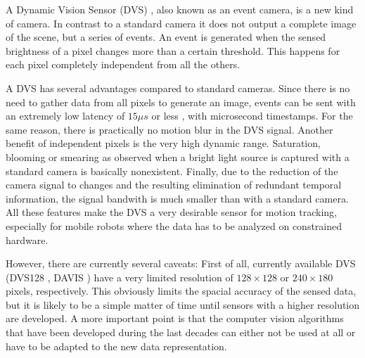 A Dynamic Vision Sensor (DVS) \cite{lpd08dvs}, also known as an event camera,
is a new kind of camera. In contrast to a standard camera it does not output a
complete image of the scene, but a series of events. An event is generated when
the sensed brightness of a pixel changes more than a certain threshold. This
happens for each pixel completely independent from all the others.

A DVS has several advantages compared to standard cameras. Since there is no
need to gather data from all pixels to generate an image, events can be sent
with an extremely low latency of $15 \mu s$ or less \cite{lpd08dvs, brandli14davis},
with microsecond timestamps.  For the same reason, there is practically no
motion blur in the DVS signal.  Another benefit of independent pixels is the
very high dynamic range.  Saturation, blooming or smearing as observed when a
bright light source is captured with a standard camera is basically
nonexistent. Finally, due to the reduction of the camera signal to changes and
the resulting elimination of redundant temporal information, the signal
bandwith is much smaller than with a standard camera.
All these features make the DVS a very desirable sensor for motion tracking,
especially for mobile robots where the data has to be analyzed on constrained
hardware.

However, there are currently several caveats: First of all, currently available
DVS (DVS128 \cite{lpd08dvs}, DAVIS \cite{brandli14davis}) have a very limited
resolution of $128 \times 128$ or $240 \times 180$ pixels, respectively. This
obviously limits the spacial accuracy of the sensed data, but it is likely to
be a simple matter of time until sensors with a higher resolution are
developed. A more important point is that the computer vision algorithms that
have been developed during the last decades can either not be used at all or
have to be adapted to the new data representation.
